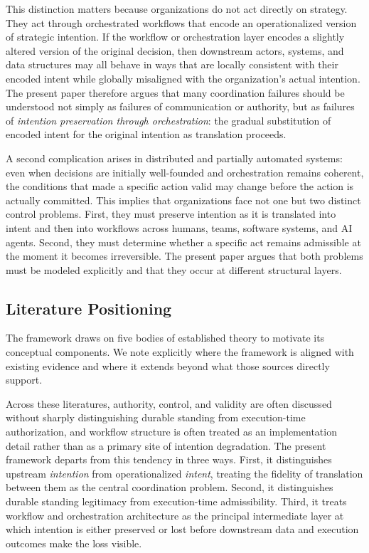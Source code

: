 \documentclass[12pt]{article}
\begin{document}
This distinction matters because organizations do not act directly on strategy.
They act through orchestrated workflows that encode an operationalized version
of strategic intention. If the workflow or orchestration layer encodes a
slightly altered version of the original decision, then downstream actors,
systems, and data structures may all behave in ways that are locally consistent
with their encoded intent while globally misaligned with the organization's
actual intention. The present paper therefore argues that many coordination
failures should be understood not simply as failures of communication or
authority, but as failures of \emph{intention preservation through
orchestration}: the gradual substitution of encoded intent for the original
intention as translation proceeds.

A second complication arises in distributed and partially automated systems:
even when decisions are initially well-founded and orchestration remains
coherent, the conditions that made a specific action valid may change before
the action is actually committed. This implies that organizations face not one
but two distinct control problems. First, they must preserve intention as it
is translated into intent and then into workflows across humans, teams,
software systems, and AI agents. Second, they must determine whether a
specific act remains admissible at the moment it becomes irreversible. The
present paper argues that both problems must be modeled explicitly and that
they occur at different structural layers.

\subsection{Literature Positioning}

The framework draws on five bodies of established theory to motivate its
conceptual components. We note explicitly where the framework is aligned with
existing evidence and where it extends beyond what those sources directly
support.

Across these literatures, authority, control, and validity are often discussed
without sharply distinguishing durable standing from execution-time
authorization, and workflow structure is often treated as an implementation
detail rather than as a primary site of intention degradation. The present
framework departs from this tendency in three ways. First, it distinguishes
upstream \emph{intention} from operationalized \emph{intent}, treating the
fidelity of translation between them as the central coordination problem.
Second, it distinguishes durable standing legitimacy from execution-time
admissibility. Third, it treats workflow and orchestration architecture as the
principal intermediate layer at which intention is either preserved or lost
before downstream data and execution outcomes make the loss visible.
\end{document}
